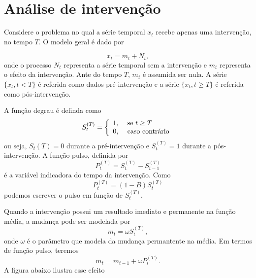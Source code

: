 \documentclass[
  letterpaper,
  DIV=11,
  numbers=noendperiod]{scrartcl}
\theoremstyle{plain}
\theoremstyle{plain}
\theoremstyle{definition}
\theoremstyle{definition}
\theoremstyle{remark}
\begin{document}
\hypertarget{anuxe1lise-de-intervenuxe7uxe3o}{%
\section{Análise de intervenção}\label{anuxe1lise-de-intervenuxe7uxe3o}}

Considere o problema no qual a série temporal \(x_t\) recebe apenas uma
intervenção, no tempo \(T\). O modelo geral é dado por

\[x_t=m_t+N_t,\] onde o processo \(N_t\) representa a série temporal sem
a intervenção e \(m_t\) representa o efeito da intervenção. Ante do
tempo \(T\), \(m_t\) é assumida ser nula. A série \(\{x_t,t<T\}\) é
referida como dados pré-intervenção e a série \(\{x_t,t\geq T\}\) é
referida como pós-intervenção.

A função degrau é definda como
\[S_t^{(T)}=\left\{\begin{array}{ll}1,&\hbox{ se }t\geq T\\ 0,&\hbox{ caso contrário}\end{array}\right.\]
ou seja, \(S_t(T)=0\) durante a pré-intervenção e \(S_t^(T)=1\) durante
a pós-intervenção. A função pulso, definida por
\[P^{(T)}_t=S_t^{(T)}-S_{t-1}^{(T)}\] é a variável indicadora do tempo
da intervenção. Como \[P_t^{(T)}=(1-B)S_t^{(T)}\] podemos escrever o
pulso em função de \(S_t^{(T)}\).

Quando a intervenção possui um resultado imediato e permanente na função
média, a mudança pode ser modelada por \[m_t=\omega S_t^{(T)},\] onde
\(\omega\) é o parâmetro que modela da mudança permantente na média. Em
termos de função pulso, teremos \[m_t=m_{t-1}+\omega P_t^{(T)}.\] A
figura abaixo ilustra esse efeito
\end{document}
